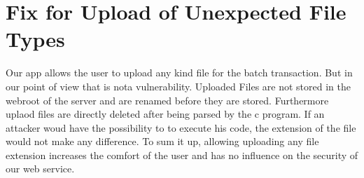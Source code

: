 \section{Fix for Upload of Unexpected File Types}
Our app allows the user to upload any kind file for the batch transaction. But in our point of view that is nota vulnerability. Uploaded Files are not stored in the webroot of the server and are renamed before they are stored. Furthermore uplaod files are directly deleted after being parsed by the c program.
If an attacker woud have the possibility to to execute his code, the extension of the file would not make any difference.
To sum it up, allowing uploading any file extension increases the comfort of the user and has no influence on the security of our web service.
